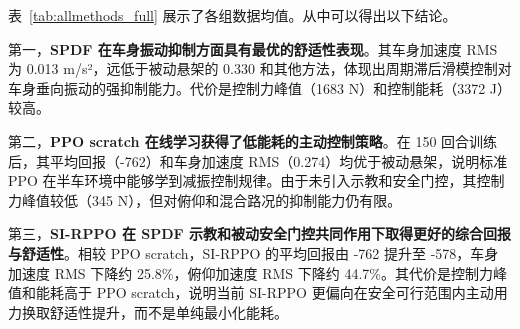 \begin{table}[htbp]
\centering
\caption{六种控制方法在 7 种路况下的全指标均值对比}
\label{tab:allmethods_full}
\renewcommand{\arraystretch}{1.15}
\setlength{\tabcolsep}{3.5pt}
\end{table}

表~\ref{tab:allmethods_full} 展示了各组数据均值。从中可以得出以下结论。

第一，\textbf{SPDF 在车身振动抑制方面具有最优的舒适性表现}。其车身加速度 RMS 为 0.013 m/s²，远低于被动悬架的 0.330 和其他方法，体现出周期滞后滑模控制对车身垂向振动的强抑制能力。代价是控制力峰值（1683 N）和控制能耗（3372 J）较高。

第二，\textbf{PPO scratch 在线学习获得了低能耗的主动控制策略}。在 150 回合训练后，其平均回报（-762）和车身加速度 RMS（0.274）均优于被动悬架，说明标准 PPO 在半车环境中能够学到减振控制规律。由于未引入示教和安全门控，其控制力峰值较低（345 N），但对俯仰和混合路况的抑制能力仍有限。

第三，\textbf{SI-RPPO 在 SPDF 示教和被动安全门控共同作用下取得更好的综合回报与舒适性}。相较 PPO scratch，SI-RPPO 的平均回报由 -762 提升至 -578，车身加速度 RMS 下降约 25.8\%，俯仰加速度 RMS 下降约 44.7\%。其代价是控制力峰值和能耗高于 PPO scratch，说明当前 SI-RPPO 更偏向在安全可行范围内主动用力换取舒适性提升，而不是单纯最小化能耗。


